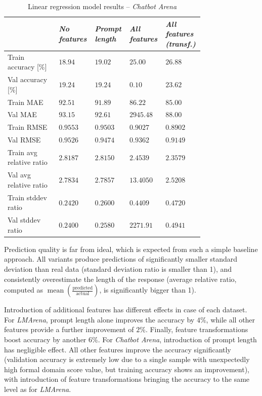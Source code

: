 \documentclass[a4paper,11pt,twoside]{report}
\theoremstyle{definition}
\begin{document}
\begin{table}[h]
    \centering
    \caption{Linear regression model results -- \textit{Chatbot Arena}}
    \begin{tabular}{
    >{\raggedright\arraybackslash}p{0.25\linewidth}
    >{\centering\arraybackslash}p{0.13\linewidth}
    >{\centering\arraybackslash}p{0.13\linewidth}
    >{\centering\arraybackslash}p{0.13\linewidth}
    >{\centering\arraybackslash}p{0.13\linewidth}
    }
        \toprule
        & \textit{No features} & \textit{Prompt length} & \textit{All features} & \textit{All features (transf.)} \\
        \midrule
        Train accuracy [\%]      & $18.94$ & $19.02$ & $25.00$ & $26.88$ \\
        Val accuracy [\%]        & $19.24$ & $19.24$ & $0.10$   & $23.62$ \\
        Train MAE                & $92.51$ & $91.89$ & $86.22$  & $85.00$ \\
        Val MAE                  & $93.15$ & $92.61$ & $2945.48$ & $88.00$ \\
        Train RMSE               & $0.9553$ & $0.9503$ & $0.9027$ & $0.8902$ \\
        Val RMSE                 & $0.9526$ & $0.9474$ & $0.9362$ & $0.9149$ \\
        Train avg relative ratio & $2.8187$ & $2.8150$ & $2.4539$ & $2.3579$ \\
        Val avg relative ratio   & $2.7834$ & $2.7857$ & $13.4050$ & $2.5208$ \\
        Train stddev ratio       & $0.2420$ & $0.2600$ & $0.4409$ & $0.4720$ \\
        Val stddev ratio         & $0.2400$ & $0.2580$ & $2271.91$ & $0.4941$ \\
        \bottomrule
    \end{tabular}
    \label{table:linear-regression-length-prediction-results-chatbot-arena}
\end{table}

Prediction quality is far from ideal, which is expected from such a simple baseline approach. All variants produce predictions of significantly smaller standard deviation than real data (standard deviation ratio is smaller than 1), and consistently overestimate the length of the response (average relative ratio, computed as $\operatorname{mean}(\frac{\text{predicted}}{\text{actual}})$, is significantly bigger than 1). 

Introduction of additional features has different effects in case of each dataset. For \textit{LMArena}, prompt length alone improves the accuracy by $4 \%$, while all other features provide a further improvement of $2 \%$. Finally, feature transformations boost accuracy by another $6 \%$. For \textit{Chatbot Arena}, introduction of prompt length has negligible effect. All other features improve the accuracy significantly (validation accuracy is extremely low due to a single sample with unexpectedly high formal domain score value, but training accuracy shows an improvement), with introduction of feature transformations bringing the accuracy to the same level as for \textit{LMArena}.
\end{document}
